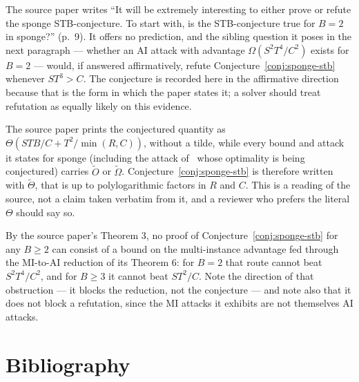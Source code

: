 \documentclass{conjura-conjecture}
\newcommand{\tO}{\tilde{O}}
\newcommand{\tOm}{\tilde{\Omega}}
\newcommand{\tTh}{\tilde{\Theta}}
\begin{document}
\begin{remark}\label{rem:direction}
The source paper writes ``It will be extremely interesting to either
prove or refute the sponge STB-conjecture. To start with, is the
STB-conjecture true for $B = 2$ in sponge?'' (p.~9). It offers no
prediction, and the sibling question it poses in the next paragraph
--- whether an AI attack with advantage $\Omega(S^{2}T^{4}/C^{2})$
exists for $B = 2$ --- would, if answered affirmatively, refute
Conjecture~\ref{conj:sponge-stb} whenever $ST^{3} > C$. The conjecture
is recorded here in the affirmative direction because that is the form
in which the paper states it; a solver should treat refutation as
equally likely on this evidence.
\end{remark}

\begin{remark}[$\tTh$ rather than $\Theta$]\label{rem:logs}
The source paper prints the conjectured quantity as
$\Theta(STB/C + T^{2}/\min(R,C))$, without a tilde, while every bound
and attack it states for sponge (including the attack
of~\cite{FGK22} whose optimality is being conjectured) carries
$\tO$ or $\tOm$. Conjecture~\ref{conj:sponge-stb} is therefore written
with $\tTh$, that is up to polylogarithmic factors in $R$ and $C$.
This is a reading of the source, not a claim taken verbatim from it,
and a reviewer who prefers the literal $\Theta$ should say so.
\end{remark}

\begin{remark}\label{rem:mi}
By the source paper's Theorem 3, no proof of
Conjecture~\ref{conj:sponge-stb} for any $B \ge 2$ can consist of a
bound on the multi-instance advantage fed through the MI-to-AI
reduction of its Theorem 6: for $B = 2$ that route cannot beat
$S^{2}T^{4}/C^{2}$, and for $B \ge 3$ it cannot beat $ST^{2}/C$. Note
the direction of that obstruction --- it blocks the reduction, not the
conjecture --- and note also that it does not block a refutation, since
the MI attacks it exhibits are not themselves AI attacks.
\end{remark}

\section{Bibliography}
\end{document}
